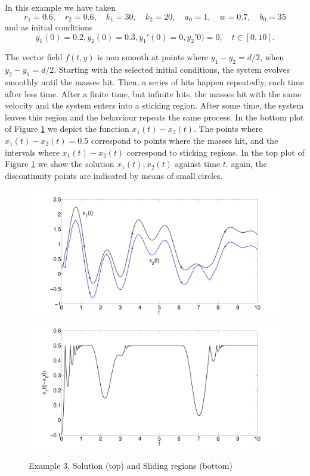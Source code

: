 \documentclass{article}
\begin{document}
\begin{description}
In this example we have taken
\[
r_1=0.6, \quad r_2=0.6, \quad k_1=30, \quad k_2=20, \quad  a_0=1, \quad w=0.7,
\quad b_0=35
\]
and as initial conditions
\[
y_1(0) = 0.2, y_2(0)=0.3, y_1'(0)=0, y_2'0)=0, \quad
t\in[0,10].
\]

\medskip

The vector field $f(t,y)$ is non smooth at points where $y_1-y_2=d/2$,
when $y_2-y_1=d/2$.
Starting with the selected initial conditions, the system evolves smoothly until the masses hit. Then,
a series of hits happen repeatedly, each time after less time.  After a finite time, but infinite hits,
the masses hit with the same velocity and the system enters into a sticking region.  After some time, the
system leaves this region and the behaviour repeats the same process.  In the bottom plot of
Figure \ref{Example3} we depict the function $x_1(t)-x_2(t)$.  The points where
$x_1(t)-x_2(t)=0.5$ correspond to points where the masses hit, and the intervals where
$x_1(t)-x_2(t)$ correspond to sticking regions. In the top plot of Figure \ref{Example3}
we show the solution $x_1(t), x_2(t)$ against time $t$. again, the discontinuity points
are indicated by means of small circles.

\begin{figure}[!h]
\includegraphics[width=12 true cm]{Example3} \\
\includegraphics[width=12 true cm]{Example3-sliding}
\caption{Example 3, Solution (top) and  Sliding regions (bottom)}
\label{Example3}
\end{figure}


\end{description}
\end{document}
